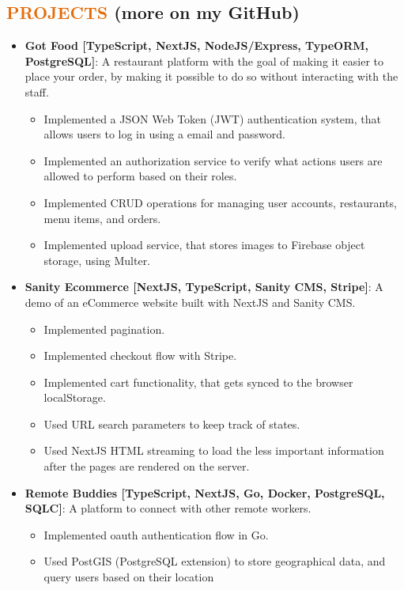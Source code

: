 \documentclass[a4paper, 20pt]{article}
\newcommand{\resumeItem}[2]{
  \item\small{
    \textbf{#1}{: #2 \vspace{-2pt}}
  }
}
\newcommand{\resumeSubItem}[2]{\resumeItem{#1}{#2}\vspace{-3pt}}
\newcommand{\resumeSubHeadingListStart}{\begin{itemize}[leftmargin=*]}
\newcommand{\resumeSubHeadingListEnd}{\end{itemize}}
\begin{document}
\begin{CJK*}{UTF8}{gbsn}
\section{\textcolor[HTML]{E36C09}{\textbf{PROJECTS}} \tiny{(more on my GitHub)}}
\resumeSubHeadingListStart{}
  \resumeSubItem{Got Food [TypeScript, NextJS, NodeJS/Express, TypeORM, PostgreSQL]}{A restaurant platform with the goal of making it easier to place your order, by making it possible to do so without interacting with the staff.}
    \begin{itemize}
      \item{Implemented a JSON Web Token (JWT) authentication system, that allows users to log in using a email and password.}
      \item{Implemented an authorization service to verify what actions users are allowed to perform based on their roles.}
      \item{Implemented CRUD operations for managing user accounts, restaurants, menu items, and orders.}
      \item{Implemented upload service, that stores images to Firebase object storage, using Multer.}
    \end{itemize}
    \vspace{2pt}
  \resumeSubItem{Sanity Ecommerce [NextJS, TypeScript, Sanity CMS, Stripe]}{A demo of an eCommerce website built with NextJS and Sanity CMS.}
    \begin{itemize}
      \item{Implemented pagination.}
      \item{Implemented checkout flow with Stripe.}
      \item{Implemented cart functionality, that gets synced to the browser localStorage.}
      \item{Used URL search parameters to keep track of states.}
      \item{Used NextJS HTML streaming to load the less important information after the pages are rendered on the server.}
    \end{itemize}
    \vspace{2pt}
  \resumeSubItem{Remote Buddies [TypeScript, NextJS, Go, Docker, PostgreSQL, SQLC]}{A platform to connect with other remote workers.}
    \begin{itemize}
      \item{Implemented oauth authentication flow in Go.}
      \item{Used PostGIS (PostgreSQL extension) to store geographical data, and query users based on their location}
    \end{itemize}
    \vspace{2pt}
\resumeSubHeadingListEnd{}


\clearpage\end{CJK*}
\end{document}

